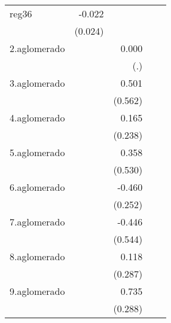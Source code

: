 {\begin{longtable}{l*{4}{D{.}{.}{-1}}}
\addlinespace
reg36       &      -0.022         &                     &                     &                     \\
            &     (0.024)         &                     &                     &                     \\
\addlinespace
2.aglomerado&                     &       0.000         &                     &                     \\
            &                     &         (.)         &                     &                     \\
\addlinespace
3.aglomerado&                     &       0.501         &                     &                     \\
            &                     &     (0.562)         &                     &                     \\
\addlinespace
4.aglomerado&                     &       0.165         &                     &                     \\
            &                     &     (0.238)         &                     &                     \\
\addlinespace
5.aglomerado&                     &       0.358         &                     &                     \\
            &                     &     (0.530)         &                     &                     \\
\addlinespace
6.aglomerado&                     &      -0.460         &                     &                     \\
            &                     &     (0.252)         &                     &                     \\
\addlinespace
7.aglomerado&                     &      -0.446         &                     &                     \\
            &                     &     (0.544)         &                     &                     \\
\addlinespace
8.aglomerado&                     &       0.118         &                     &                     \\
            &                     &     (0.287)         &                     &                     \\
\addlinespace
9.aglomerado&                     &       0.735\sym{*}  &                     &                     \\
            &                     &     (0.288)         &                     &                     \\

\end{longtable}}
